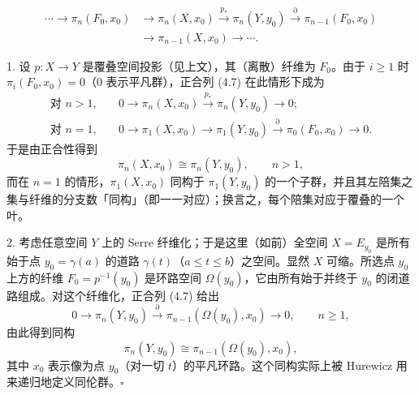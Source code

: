 \begin{equation}
  \begin{aligned}
    \cdots\to\pi_n(F_0,x_0)&\to\pi_n(X,x_0)\xrightarrow{p_*}\pi_n(Y,y_0)
    \xrightarrow{\partial}\pi_{n-1}(F_0,x_0)\\
    &\to\pi_{n-1}(X,x_0)\to\cdots.
  \end{aligned}
  \tag{4.7}
\end{equation}

1. 设 $p:X\to Y$ 是覆叠空间投影（见上文），其（离散）纤维为 $F_0$。由于 $i\ge1$ 时 $\pi_i(F_0,x_0)=0$（$0$ 表示平凡群），正合列 (4.7) 在此情形下成为
\[
  \begin{aligned}
    \text{对 } n>1,&\quad 0\to\pi_n(X,x_0)\xrightarrow{p_*}\pi_n(Y,y_0)\to 0;\\
    \text{对 } n=1,&\quad 0\to\pi_1(X,x_0)\to\pi_1(Y,y_0)
    \xrightarrow{\partial}\pi_0(F_0,x_0)\to 0.
  \end{aligned}
\]
于是由正合性得到
\begin{equation}
  \pi_n(X,x_0)\cong\pi_n(Y,y_0),\qquad n>1, \tag{4.8}
\end{equation}
而在 $n=1$ 的情形，$\pi_1(X,x_0)$ 同构于 $\pi_1(Y,y_0)$ 的一个子群，并且其左陪集之集与纤维的分支数「同构」（即一一对应）；换言之，每个陪集对应于覆叠的一个叶。

2. 考虑任意空间 $Y$ 上的 Serre 纤维化；于是这里（如前）全空间 $X=E_{y_0}$ 是所有始于点 $y_0=\gamma(a)$ 的道路 $\gamma(t)$（$a\le t\le b$）之空间。显然 $X$ 可缩。所选点 $y_0$ 上方的纤维 $F_0=p^{-1}(y_0)$ 是环路空间 $\Omega(y_0)$，它由所有始于并终于 $y_0$ 的闭道路组成。对这个纤维化，正合列 (4.7) 给出
\[
  0\to\pi_n(Y,y_0)\xrightarrow{\partial}\pi_{n-1}(\Omega(y_0),x_0)\to 0,
  \qquad n\ge1,
\]
由此得到同构
\begin{equation}
  \pi_n(Y,y_0)\cong\pi_{n-1}(\Omega(y_0),x_0), \tag{4.9}
\end{equation}
其中 $x_0$ 表示像为点 $y_0$（对一切 $t$）的平凡环路。这个同构实际上被 Hurewicz 用来递归地定义同伦群。\hfill$\square$

